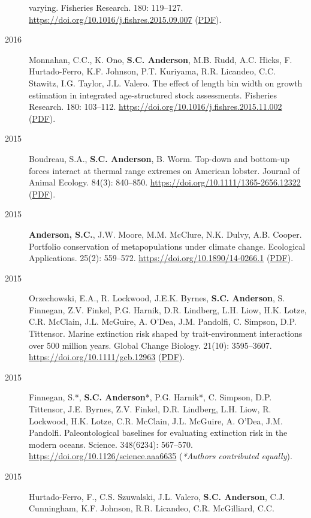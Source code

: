 \begin{description}
varying. Fisheries Research. 180: 119--127.
\url{https://doi.org/10.1016/j.fishres.2015.09.007}
(\href{https://www.dropbox.com/s/425a18a4xm9kq8l/Kuriyama_etal_2016_empirical.pdf?dl=1}{PDF}).
\item[2016]
Monnahan, C.C., K. Ono, \textbf{S.C. Anderson}, M.B. Rudd, A.C. Hicks,
F. Hurtado-Ferro, K.F. Johnson, P.T. Kuriyama, R.R. Licandeo, C.C.
Stawitz, I.G. Taylor, J.L. Valero. The effect of length bin width on
growth estimation in integrated age-structured stock assessments.
Fisheries Research. 180: 103--112.
\url{https://doi.org/10.1016/j.fishres.2015.11.002}
(\href{https://www.dropbox.com/s/uksmdtptby9w0ku/Monnahan_etal_2016_binwidth.pdf?dl=1}{PDF}).
\item[2015]
Boudreau, S.A., \textbf{S.C. Anderson}, B. Worm. Top-down and bottom-up
forces interact at thermal range extremes on American lobster. Journal
of Animal Ecology. 84(3): 840--850.
\url{https://doi.org/10.1111/1365-2656.12322}
(\href{https://www.dropbox.com/s/w027swfx2o8hgvl/Boudreau_etal_2015_lobster.pdf?dl=1}{PDF}).
\item[2015]
\textbf{Anderson, S.C.}, J.W. Moore, M.M. McClure, N.K. Dulvy, A.B.
Cooper. Portfolio conservation of metapopulations under climate change.
Ecological Applications. 25(2): 559--572.
\url{https://doi.org/10.1890/14-0266.1}
(\href{https://www.dropbox.com/s/141rsnv5rc7mi5i/Anderson_etal_2015_salmonportfolios.pdf?dl=1}{PDF}).
\item[2015]
Orzechowski, E.A., R. Lockwood, J.E.K. Byrnes, \textbf{S.C. Anderson},
S. Finnegan, Z.V. Finkel, P.G. Harnik, D.R. Lindberg, L.H. Liow, H.K.
Lotze, C.R. McClain, J.L. McGuire, A. O'Dea, J.M. Pandolfi, C. Simpson,
D.P. Tittensor. Marine extinction risk shaped by trait-environment
interactions over 500 million years. Global Change Biology. 21(10):
3595--3607. \url{https://doi.org/10.1111/gcb.12963}
(\href{https://sean.updog.co/papers/Orzechowski_etal_2015_paleometa.pdf}{PDF}).
\item[2015]
Finnegan, S.*, \textbf{S.C. Anderson}*, P.G. Harnik*, C. Simpson, D.P.
Tittensor, J.E. Byrnes, Z.V. Finkel, D.R. Lindberg, L.H. Liow, R.
Lockwood, H.K. Lotze, C.R. McClain, J.L. McGuire, A. O'Dea, J.M.
Pandolfi. Paleontological baselines for evaluating extinction risk in
the modern oceans. Science. 348(6234): 567--570.
\url{https://doi.org/10.1126/science.aaa6635} (\emph{*Authors
contributed equally}).
\item[2015]
Hurtado-Ferro, F., C.S. Szuwalski, J.L. Valero, \textbf{S.C. Anderson},
C.J. Cunningham, K.F. Johnson, R.R. Licandeo, C.R. McGilliard, C.C.

\end{description}
